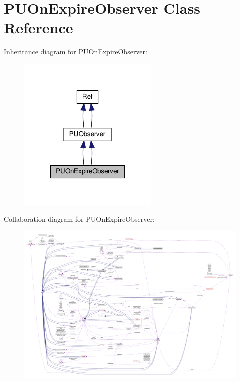 \hypertarget{classPUOnExpireObserver}{}\section{P\+U\+On\+Expire\+Observer Class Reference}
\label{classPUOnExpireObserver}


Inheritance diagram for P\+U\+On\+Expire\+Observer\+:
\nopagebreak
\begin{figure}[H]
\begin{center}
\leavevmode
\includegraphics[width=191pt]{classPUOnExpireObserver__inherit__graph}
\end{center}
\end{figure}


Collaboration diagram for P\+U\+On\+Expire\+Observer\+:
\nopagebreak
\begin{figure}[H]
\begin{center}
\leavevmode
\includegraphics[width=350pt]{classPUOnExpireObserver__coll__graph}
\end{center}
\end{figure}
